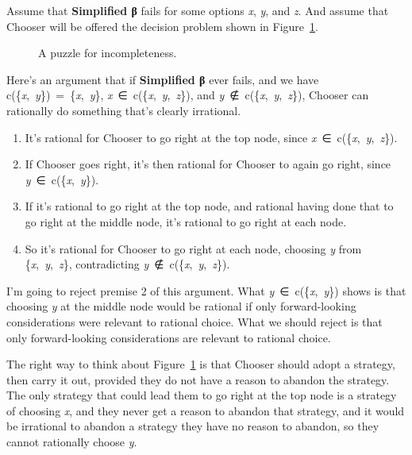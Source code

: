 \documentclass[
  10pt,
  letterpaper,
  DIV=11,
  numbers=noendperiod,
  twoside]{scrartcl}
\providecommand{\tightlist}{%
  \setlength{\itemsep}{0pt}\setlength{\parskip}{0pt}}\usepackage{longtable,booktabs,array}
\begin{document}
Assume that \textbf{Simplified β} fails for some options \emph{x},
\emph{y}, and \emph{z}. And assume that Chooser will be offered the
decision problem shown in Figure~\ref{fig-beta}.

\begin{figure}


\caption{\label{fig-beta}A puzzle for incompleteness.}

\end{figure}%

Here's an argument that if \textbf{Simplified β} ever fails, and we have
c(\{\emph{x},~\emph{y}\})~=~\{\emph{x},~\emph{y}\},
\emph{x}~∈~c(\{\emph{x},~\emph{y},~\emph{z}\}), and
\emph{y}~∉~c(\{\emph{x},~\emph{y},~\emph{z}\}), Chooser can rationally
do something that's clearly irrational.

\begin{enumerate}
\def\labelenumi{\arabic{enumi}.}
\tightlist
\item
  It's rational for Chooser to go right at the top node, since
  \emph{x}~∈~c(\{\emph{x},~\emph{y},~\emph{z}\}).
\item
  If Chooser goes right, it's then rational for Chooser to again go
  right, since \emph{y}~∈~c(\{\emph{x},~\emph{y}\}).
\item
  If it's rational to go right at the top node, and rational having done
  that to go right at the middle node, it's rational to go right at each
  node.
\item
  So it's rational for Chooser to go right at each node, choosing
  \emph{y} from \{\emph{x},~\emph{y},~\emph{z}\}, contradicting
  \emph{y}~∉~c(\{\emph{x},~\emph{y},~\emph{z}\}).
\end{enumerate}

I'm going to reject premise 2 of this argument. What
\emph{y}~∈~c(\{\emph{x},~\emph{y}\}) shows is that choosing \emph{y} at
the middle node would be rational if only forward-looking considerations
were relevant to rational choice. What we should reject is that only
forward-looking considerations are relevant to rational choice.

The right way to think about Figure~\ref{fig-beta} is that Chooser
should adopt a strategy, then carry it out, provided they do not have a
reason to abandon the strategy. The only strategy that could lead them
to go right at the top node is a strategy of choosing \emph{x}, and they
never get a reason to abandon that strategy, and it would be irrational
to abandon a strategy they have no reason to abandon, so they cannot
rationally choose \emph{y}.
\end{document}
